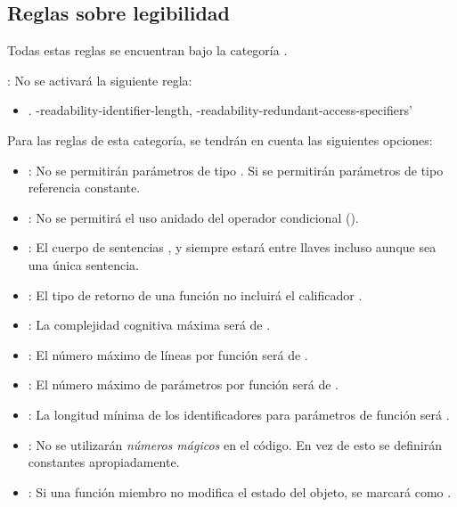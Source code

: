 \subsection{Reglas sobre legibilidad}

Todas estas reglas se encuentran bajo la categoría .

: No se activará la siguiente regla:
\begin{itemize}

\item {}.
-readability-identifier-length,
-readability-redundant-access-specifiers'

\end{itemize}

Para las reglas de esta categoría, se tendrán en cuenta las siguientes
opciones:

\begin{itemize}

\item {}:
No se permitirán parámetros de tipo .
Si se permitirán parámetros de tipo referencia constante.

\item {}:
No se permitirá el uso anidado del operador condicional ().

\item {}:
El cuerpo de sentencias ,  y 
siempre estará entre llaves incluso aunque sea una única sentencia.

\item {}:
El tipo de retorno de una función no incluirá el calificador .

\item {}:
La complejidad cognitiva máxima será de .

\item {}:
El número máximo de líneas por función será de .

\item {}:
El número máximo de parámetros por función será de .

\item {}:
La longitud mínima de los identificadores para parámetros de función será .

\item {}:
No se utilizarán \emph{números mágicos} en el código.
En vez de esto se definirán constantes apropiadamente.

\item {}:
Si una función miembro no modifica el estado del objeto, se marcará como .



\end{itemize}
